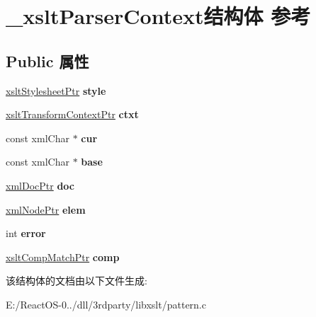 \hypertarget{struct__xslt_parser_context}{}\section{\+\_\+xslt\+Parser\+Context结构体 参考}
\label{struct__xslt_parser_context}
\subsection*{Public 属性}
\begin{DoxyCompactItemize}
\item 
\mbox{\label{struct__xslt_parser_context_a69882340dedb4c4435b151bfd0b09134}} 
\hyperlink{struct__xslt_stylesheet}{xslt\+Stylesheet\+Ptr} {\bfseries style}
\item 
\mbox{\label{struct__xslt_parser_context_aaa8445580c4765c39c24bc83bbd28b0a}} 
\hyperlink{struct__xslt_transform_context}{xslt\+Transform\+Context\+Ptr} {\bfseries ctxt}
\item 
\mbox{\label{struct__xslt_parser_context_a9cbdd8b3f74c3fa79a56e01b77e8ff3b}} 
const xml\+Char $\ast$ {\bfseries cur}
\item 
\mbox{\label{struct__xslt_parser_context_a9f15d83d88925ba59affc5e6fafd0621}} 
const xml\+Char $\ast$ {\bfseries base}
\item 
\mbox{\label{struct__xslt_parser_context_a5ed3d2a2be9ae819d08fe5167ac5c837}} 
\hyperlink{struct__xml_doc}{xml\+Doc\+Ptr} {\bfseries doc}
\item 
\mbox{\label{struct__xslt_parser_context_ae68e8f7fac9d63310a4054ddc918fac6}} 
\hyperlink{struct__xml_node}{xml\+Node\+Ptr} {\bfseries elem}
\item 
\mbox{\label{struct__xslt_parser_context_a37757af7f244bc9d5b078dd0c299b081}} 
int {\bfseries error}
\item 
\mbox{\label{struct__xslt_parser_context_a6b283c2213032e05f269cd112c6cbfb9}} 
\hyperlink{struct__xslt_comp_match}{xslt\+Comp\+Match\+Ptr} {\bfseries comp}
\end{DoxyCompactItemize}


该结构体的文档由以下文件生成\+:\begin{DoxyCompactItemize}
\item 
E\+:/\+React\+O\+S-\/0../dll/3rdparty/libxslt/pattern.\+c\end{DoxyCompactItemize}
